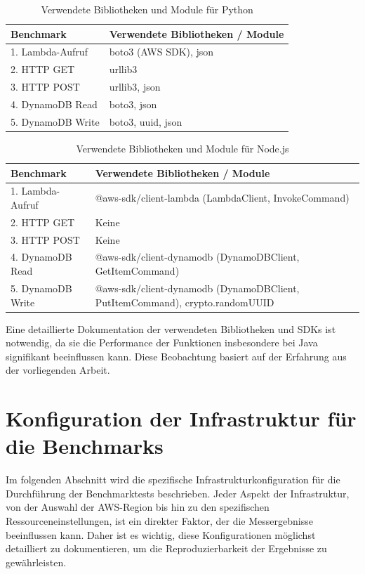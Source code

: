 \begin{table}[H]
\centering
\caption{Verwendete Bibliotheken und Module für Python}
\label{tab:python-libraries}
\begin{tabular}{|p{3.5cm}|p{9cm}|}
\hline
\textbf{Benchmark} & \textbf{Verwendete Bibliotheken / Module} \\
\hline
1. Lambda-Aufruf & boto3 (AWS SDK), json \\
\hline
2. HTTP GET & urllib3 \\
\hline
3. HTTP POST & urllib3, json \\
\hline
4. DynamoDB Read & boto3, json \\
\hline
5. DynamoDB Write & boto3, uuid, json \\
\hline
\end{tabular}
\end{table}

\begin{table}[H]
\centering
\caption{Verwendete Bibliotheken und Module für Node.js}
\label{tab:nodejs-libraries}
\begin{tabular}{|p{3.5cm}|p{9cm}|}
\hline
\textbf{Benchmark} & \textbf{Verwendete Bibliotheken / Module} \\
\hline
1. Lambda-Aufruf & @aws-sdk/client-lambda (LambdaClient, InvokeCommand)\\
\hline
2. HTTP GET & Keine\\ 
\hline
3. HTTP POST & Keine\\ 
\hline
4. DynamoDB Read & @aws-sdk/client-dynamodb (DynamoDBClient, GetItemCommand)\\
\hline
5. DynamoDB Write & @aws-sdk/client-dynamodb (DynamoDBClient, PutItemCommand), crypto.randomUUID\\
\hline
\end{tabular}
\end{table}

Eine detaillierte Dokumentation der verwendeten Bibliotheken und SDKs ist notwendig, da sie die Performance der Funktionen 
insbesondere bei Java signifikant beeinflussen kann. Diese Beobachtung basiert auf der Erfahrung aus der vorliegenden Arbeit.

\section{Konfiguration der Infrastruktur für die Benchmarks}
Im folgenden Abschnitt wird die spezifische Infrastrukturkonfiguration für die Durchführung der Benchmarktests beschrieben. 
Jeder Aspekt der Infrastruktur, von der Auswahl der AWS-Region bis hin zu den spezifischen Ressourceneinstellungen, ist ein direkter 
Faktor, der die Messergebnisse beeinflussen kann. Daher ist es wichtig, diese Konfigurationen möglichst detailliert zu dokumentieren, 
um die Reproduzierbarkeit der Ergebnisse zu gewährleisten.

